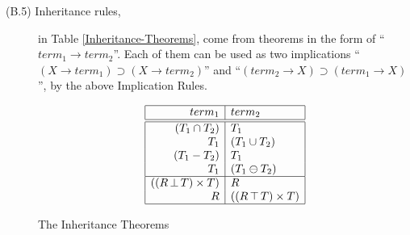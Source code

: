 \begin{description}
  \item[(B.5) Inheritance rules,] in Table \ref{Inheritance-Theorems}, come from theorems in the form of ``\(term_1 \rightarrow term_2\)''. Each of them can be used as two implications ``\((X \rightarrow term_1) \supset (X \rightarrow term_2)\)'' and ``\((term_2 \rightarrow X) \supset (term_1 \rightarrow X)\)'', by the above Implication Rules.

\begin{table}[htb]
\[\begin{array}{|r|l|} \hline
term_1 & term_2 \\
\hline \hline
(T_1 \cap T_2) & T_1 \\
T_1 & (T_1 \cup T_2) \\
(T_1 - T_2) & T_1 \\
T_1 & (T_1 \ominus T_2) \\
\hline
((R \, \bot \, T) \times T) & R \\
R & ((R \, \top \, T) \times T) \\ 
\hline
\end{array}\]
\caption{The Inheritance Theorems}
\label{Inheritance-Theorems}
\end{table}

\end{description}

